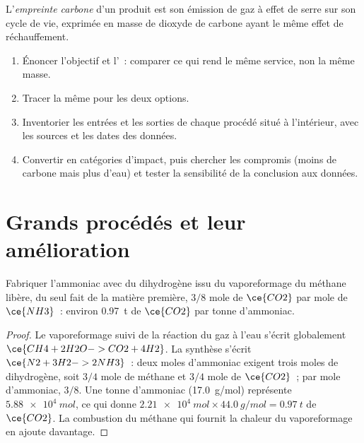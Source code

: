 \begin{definition}\label{def:b3:green-industrial:carbon-footprint}
L'\emph{empreinte carbone} d'un produit est son
émission de gaz à effet de serre sur son cycle de vie, exprimée en masse
de dioxyde de carbone ayant le même effet de réchauffement.
\end{definition}

\begin{method}\label{met:b3:green-industrial:lca}
\begin{enumerate}
  \item Énoncer l'objectif et l'~: comparer ce qui rend
        le même service, non la même masse.
  \item Tracer la même  pour les deux options.
  \item Inventorier les entrées et les sorties de chaque procédé situé à
        l'intérieur, avec les sources et les dates des données.
  \item Convertir en catégories d'impact, puis chercher les compromis
        (moins de carbone mais plus d'eau) et tester la sensibilité de la
        conclusion aux données.
\end{enumerate}
\end{method}

\section{Grands procédés et leur amélioration}

\begin{proposition}\label{prop:b3:green-industrial:smr}
Fabriquer l'ammoniac avec du dihydrogène issu du vaporeformage du méthane
libère, du seul fait de la matière première,
$3/8$ mole de $\ce{CO2}$ par mole de $\ce{NH3}$~: environ \qty{0.97}{t} de $\ce{CO2}$ par tonne d'ammoniac.
\end{proposition}

\begin{proof}
Le vaporeformage suivi de la réaction du gaz à l'eau s'écrit globalement $\ce{CH4 + 2H2O -> CO2 + 4H2}$. La synthèse
s'écrit $\ce{N2 + 3H2 -> 2NH3}$~: deux moles d'ammoniac exigent trois moles de dihydrogène, soit $3/4$ mole de
méthane et $3/4$ mole de $\ce{CO2}$~; par mole d'ammoniac, $3/8$. Une tonne d'ammoniac
(\qty{17.0}{g/mol}) représente $\qty{5.88e4}{mol}$, ce qui donne $\qty{2.21e4}{mol} \times \qty{44.0}{g/mol} = \qty{0.97}{t}$ de $\ce{CO2}$. La combustion du méthane
qui fournit la chaleur du vaporeformage en ajoute davantage.
\end{proof}

